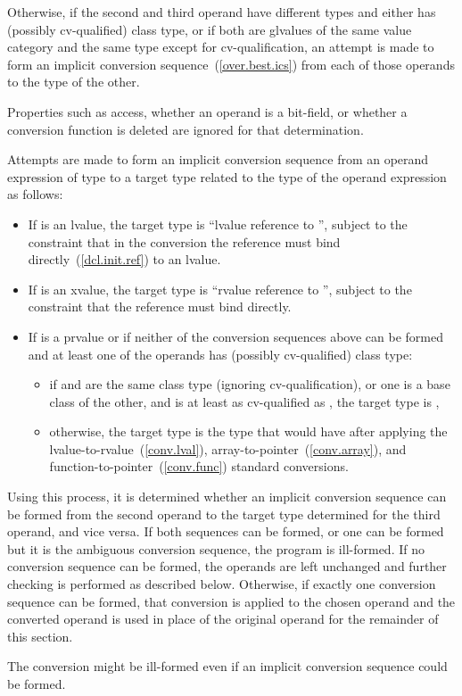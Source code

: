 \pnum
Otherwise, if the second and third operand have different types and
either has (possibly cv-qualified) class type, or if both
are glvalues of the same value category and the same type except for
cv-qualification, an attempt is made to
form an implicit conversion sequence~(\ref{over.best.ics}) from
each of those operands to the type of the other.
\begin{note}
Properties such as access, whether an operand is a bit-field, or whether
a conversion function is deleted are ignored for that determination.
\end{note}
Attempts are made to form an implicit conversion sequence
from an operand expression  of type 
to a target type related to the type 
of the operand expression  as follows:

\begin{itemize}
\item If  is an lvalue, the target type is 
``lvalue reference to '', subject to the
constraint that in the conversion the reference must bind
directly~(\ref{dcl.init.ref}) to an lvalue.

\item If  is an xvalue, the target type is
``rvalue reference to '',
subject to the constraint that the reference must bind directly.

\item If  is a prvalue or if neither of the conversion sequences above can be
formed and at least one of the operands has (possibly cv-qualified) class type:

\begin{itemize}
\item if  and  are the same class type
(ignoring cv-qualification), or one is a base class of the other, and
 is at least as cv-qualified as ,
the target type is ,
    
\item otherwise, the target type is the type that  would have
after applying the
lvalue-to-rvalue~(\ref{conv.lval}),
array-to-pointer~(\ref{conv.array}), and
function-to-pointer~(\ref{conv.func})
standard conversions.
\end{itemize}
\end{itemize}

Using this process, it is determined whether an implicit conversion
sequence can be formed from the second operand 
to the target type determined for the third operand, and vice versa.
If both sequences can be formed, or one can be formed but it is the
ambiguous conversion sequence, the program is ill-formed.
If no conversion sequence can be formed, the operands are left unchanged
and further checking is performed as described below.
Otherwise, if exactly one conversion sequence can be formed,
that conversion is applied to the chosen operand
and the converted operand is used in place of the original operand for
the remainder of this section.
\begin{note}
The conversion might be ill-formed even if an implicit conversion
sequence could be formed.
\end{note}

